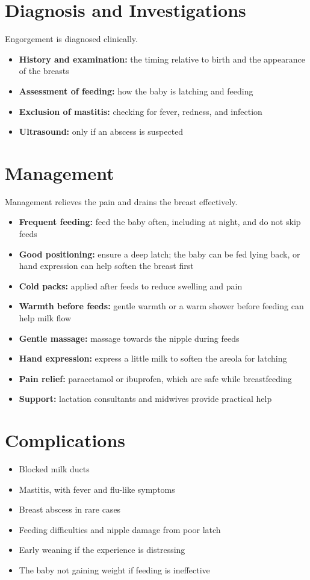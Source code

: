 \section*{Diagnosis and Investigations}
Engorgement is diagnosed clinically.
\begin{itemize}
    \item \textbf{History and examination:} the timing relative to birth and the appearance of the breasts
    \item \textbf{Assessment of feeding:} how the baby is latching and feeding
    \item \textbf{Exclusion of mastitis:} checking for fever, redness, and infection
    \item \textbf{Ultrasound:} only if an abscess is suspected
\end{itemize}

\section*{Management}
Management relieves the pain and drains the breast effectively.
\begin{itemize}
    \item \textbf{Frequent feeding:} feed the baby often, including at night, and do not skip feeds
    \item \textbf{Good positioning:} ensure a deep latch; the baby can be fed lying back, or hand expression can help soften the breast first
    \item \textbf{Cold packs:} applied after feeds to reduce swelling and pain
    \item \textbf{Warmth before feeds:} gentle warmth or a warm shower before feeding can help milk flow
    \item \textbf{Gentle massage:} massage towards the nipple during feeds
    \item \textbf{Hand expression:} express a little milk to soften the areola for latching
    \item \textbf{Pain relief:} paracetamol or ibuprofen, which are safe while breastfeeding
    \item \textbf{Support:} lactation consultants and midwives provide practical help
\end{itemize}

\section*{Complications}
\begin{itemize}
    \item Blocked milk ducts
    \item Mastitis, with fever and flu-like symptoms
    \item Breast abscess in rare cases
    \item Feeding difficulties and nipple damage from poor latch
    \item Early weaning if the experience is distressing
    \item The baby not gaining weight if feeding is ineffective
\end{itemize}

